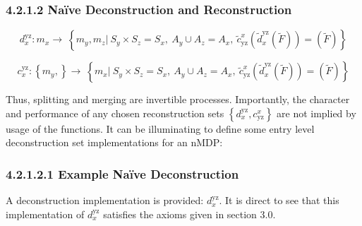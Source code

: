 \documentclass[compsoc,journal,letterpaper,10pt,draftclsnofoot,onecolumn]{IEEEtran}
\begin{document}
\subsubsection{4.2.1.2 Naïve Deconstruction and
Reconstruction}\label{nauxefve-deconstruction-and-reconstruction}
 
\begin{equation}
d_{x}^{\text{yz}}:m_{x} \rightarrow \ \left\{ m_{y},m_{z}|\ S_{y} \times S_{z} = S_{x},\ A_{y} \cup A_{z} = A_{x},\ {\tilde{c}}_{\text{yz}}^{x}\left( {\tilde{d}}_{x}^{\text{yz}}\left( \tilde{F} \right) \right) = \left( \tilde{F} \right) \right\} 
\end{equation}

\begin{equation}
c_{x}^{\text{yz}}:\left\{ m_{y}, \right\} \rightarrow \ \left\{ m_{x}|\ S_{y} \times S_{z} = S_{x},\ A_{y} \cup A_{z} = A_{x},\ {\tilde{c}}_{\text{yz}}^{x}\left( {\tilde{d}}_{x}^{\text{yz}}\left( \tilde{F} \right) \right) = \left( \tilde{F} \right) \right\} 
\end{equation}

Thus, splitting and merging are invertible processes. Importantly, the
character and performance of any chosen reconstruction sets
\(\left\{ d_{x}^{\text{yz}},c_{\text{yz}}^{x} \right\}\) are not implied
by usage of the functions. It can be illuminating to define some entry
level deconstruction set implementations for an nMDP:

\subsubsection{4.2.1.2.1 Example Naïve
Deconstruction}\label{example-nauxefve-deconstruction}

A deconstruction implementation is provided: \(d_{x}^{\text{yz}}\). It
is direct to see that this implementation of \(d_{x}^{\text{yz}}\)
satisfies the axioms given in section 3.0.
\end{document}
